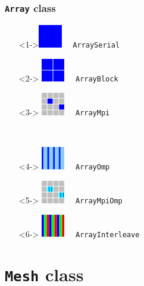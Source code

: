\documentclass{beamer}
\newcommand{\code}[1]{\texttt{#1}}
\begin{document}
\begin{frame}
\frametitle{\code{Array} class}

\begin{minipage}{1.8in}
\begin{itemize}
\item[]<1->\includegraphics[width=0.4in]{array-serial.eps} \ \ \code{ArraySerial}
\item[]<2-> \includegraphics[width=0.4in]{array-block.eps} \ \ \code{ArrayBlock}
\item[]<3-> \includegraphics[width=0.4in]{array-mpi.eps} \ \ \code{ArrayMpi}
\end{itemize}
\end{minipage} \ 
\begin{minipage}{2in}
\begin{itemize}
\item[]<4-> \includegraphics[width=0.4in]{array-omp.eps} \ \ \code{ArrayOmp}
\item[]<5-> \includegraphics[width=0.4in]{array-mpi-omp.eps} \ \ \code{ArrayMpiOmp}
\item[]<6-> \includegraphics[width=0.4in]{array-interleave.eps} \ \ \code{ArrayInterleave}
\end{itemize}
\end{minipage}

\end{frame}

\section{\code{Mesh} class}
\end{document}
